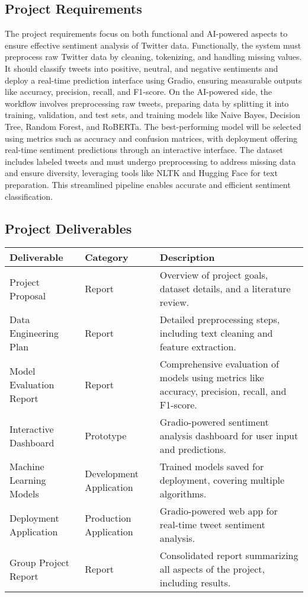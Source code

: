 \documentclass[journal]{IEEEtran}
\begin{document}
\subsection{\textbf{Project Requirements}}
The project requirements focus on both functional and AI-powered aspects to ensure effective sentiment analysis of Twitter data. Functionally, the system must preprocess raw Twitter data by cleaning, tokenizing, and handling missing values. It should classify tweets into positive, neutral, and negative sentiments and deploy a real-time prediction interface using Gradio, ensuring measurable outputs like accuracy, precision, recall, and F1-score. On the AI-powered side, the workflow involves preprocessing raw tweets, preparing data by splitting it into training, validation, and test sets, and training models like Naive Bayes, Decision Tree, Random Forest, and RoBERTa. The best-performing model will be selected using metrics such as accuracy and confusion matrices, with deployment offering real-time sentiment predictions through an interactive interface. The dataset includes labeled tweets and must undergo preprocessing to address missing data and ensure diversity, leveraging tools like NLTK and Hugging Face for text preparation. This streamlined pipeline enables accurate and efficient sentiment classification.

\subsection{Project Deliverables}
\begin{tabular}{|p{2cm}|p{2cm}|p{3cm}|}
\hline
\textbf{Deliverable} & \textbf{Category} & \textbf{Description} \\ 
\hline
Project Proposal & Report & Overview of project goals, dataset details, and a literature review. \\ 
\hline
Data Engineering Plan & Report & Detailed preprocessing steps, including text cleaning and feature extraction. \\ 
\hline
Model Evaluation Report & Report & Comprehensive evaluation of models using metrics like accuracy, precision, recall, and F1-score. \\ 
\hline
Interactive Dashboard & Prototype & Gradio-powered sentiment analysis dashboard for user input and predictions. \\ 
\hline
Machine Learning Models & Development Application & Trained models saved for deployment, covering multiple algorithms. \\ 
\hline
Deployment Application & Production Application & Gradio-powered web app for real-time tweet sentiment analysis. \\ 
\hline
Group Project Report & Report & Consolidated report summarizing all aspects of the project, including results. \\ 
\hline
\end{tabular}
\end{document}
